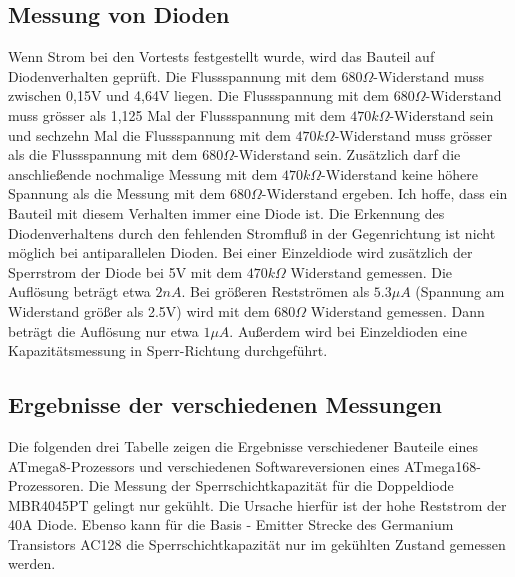 \subsection{Messung von Dioden}
\label{sec:diode}
Wenn Strom bei den Vortests festgestellt wurde, wird das Bauteil auf Diodenverhalten geprüft.
Die Flussspannung mit dem \(680\Omega\)-Widerstand muss zwischen 0,15V und 4,64V liegen.
Die Flussspannung mit dem \(680\Omega\)-Widerstand muss grösser als 1,125 Mal der Flussspannung mit dem
 \(470k\Omega\)-Widerstand sein und sechzehn Mal die Flussspannung mit dem \(470k\Omega\)-Widerstand muss
grösser als die Flussspannung mit dem \(680\Omega\)-Widerstand sein.
Zusätzlich darf die anschließende nochmalige Messung mit dem \(470k\Omega\)-Widerstand  keine höhere Spannung als die
Messung mit dem \(680\Omega\)-Widerstand ergeben.
Ich hoffe, dass ein Bauteil mit diesem Verhalten immer eine Diode ist.
Die Erkennung des Diodenverhaltens durch den fehlenden Stromfluß in der Gegenrichtung ist nicht
möglich bei antiparallelen Dioden.
Bei einer Einzeldiode wird zusätzlich der Sperrstrom der Diode bei 5V mit dem \(470k\Omega\) Widerstand
gemessen. Die Auflösung beträgt etwa \(2nA\). Bei größeren Restströmen als \(5.3\mu A\) (Spannung am Widerstand größer als 2.5V) wird
 mit dem \(680\Omega\) Widerstand gemessen. Dann beträgt die Auflösung nur etwa \(1\mu A\).
Außerdem wird bei Einzeldioden eine Kapazitätsmessung in Sperr-Richtung durchgeführt. 

\subsection{Ergebnisse der verschiedenen Messungen}
Die folgenden drei Tabelle zeigen die Ergebnisse verschiedener Bauteile 
eines ATmega8-Prozessors und verschiedenen Softwareversionen eines ATmega168-Prozessoren.
Die Messung der Sperrschichtkapazität für die Doppeldiode MBR4045PT gelingt
nur gekühlt. Die Ursache hierfür ist der hohe Reststrom der 40A Diode. Ebenso kann für die Basis - Emitter
Strecke des Germanium Transistors AC128 die Sperrschichtkapazität nur im
gekühlten Zustand gemessen werden. 

